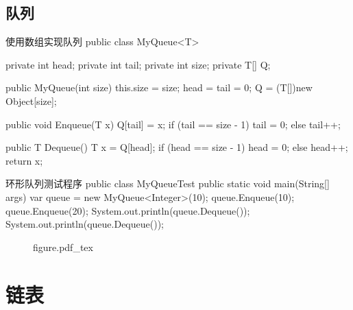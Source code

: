 \documentclass[oneside,10pt,fontset=none]{ctexbook}
\numberwithin{definition}{chapter}
\numberwithin{theorem}{chapter}
\numberwithin{lemma}{chapter}
\begin{document}
\subsection{队列}

\begin{myjava}{}{使用数组实现队列}{}
public class MyQueue<T> {
    private int head;
    private int tail;
    private int size;
    private T[] Q;

    public MyQueue(int size) {
        this.size = size;
        head = tail = 0;
        Q = (T[])new Object[size];
    }

    public void Enqueue(T x) {
        Q[tail] = x;
        if (tail == size - 1)
            tail = 0;
        else
            tail++;
    }

    public T Dequeue() {
        T x = Q[head];
        if (head == size - 1)
            head = 0;
        else
            head++;
        return x;
    }
}
\end{myjava}

\begin{myjava}{}{环形队列测试程序}{}
public class MyQueueTest {
    public static void main(String[] args) {
        var queue = new MyQueue<Integer>(10);
        queue.Enqueue(10);
        queue.Enqueue(20);
        System.out.println(queue.Dequeue());
        System.out.println(queue.Dequeue());
    }
}
\end{myjava}

\begin{figure}[htbp]
    \def\svgwidth{\columnwidth}
    {figure.pdf_tex}
\end{figure}

\section{链表}
\end{document}
